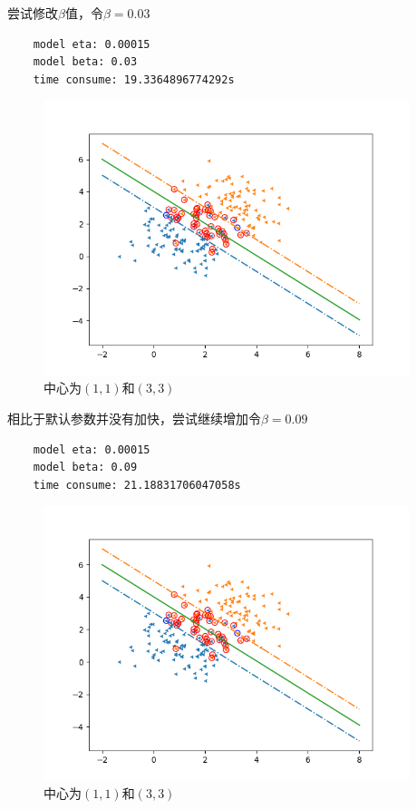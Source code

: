 \documentclass{article}
\begin{document}
尝试修改$\beta$值，令$\beta=0.03$
\begin{verbatim}
    model eta: 0.00015
    model beta: 0.03
    time consume: 19.3364896774292s
    \end{verbatim}
\begin{figure}[H]
        \centering
        \begin{minipage}[t]{1.0\linewidth}
            \centering
            \includegraphics[height=8cm]{runtime_4.png}
            \caption{中心为$(1,1)$和$(3,3)$}
\end{minipage}
\end{figure}
相比于默认参数并没有加快，尝试继续增加令$\beta=0.09$
\begin{verbatim}
    model eta: 0.00015
    model beta: 0.09
    time consume: 21.18831706047058s
    \end{verbatim}
\begin{figure}[H]
        \centering
        \begin{minipage}[t]{1.0\linewidth}
            \centering
            \includegraphics[height=8cm]{runtime_5.png}
            \caption{中心为$(1,1)$和$(3,3)$}
\end{minipage}
\end{figure}
\end{document}
